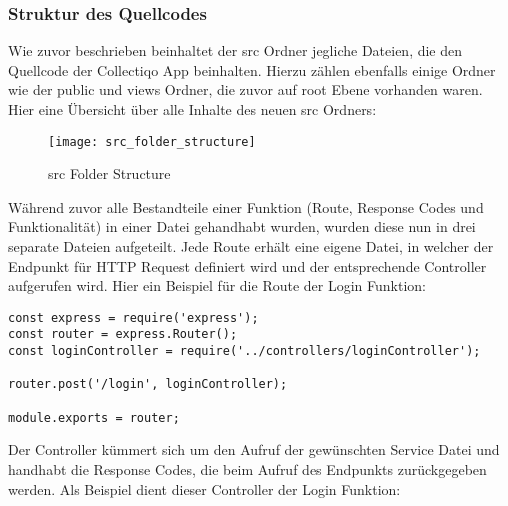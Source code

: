 \subsubsection{Struktur des Quellcodes}
Wie zuvor beschrieben beinhaltet der src Ordner jegliche Dateien, die den Quellcode der Collectiqo App beinhalten.
Hierzu zählen ebenfalls einige Ordner wie der public und views Ordner, die zuvor auf root Ebene vorhanden waren.
Hier eine Übersicht über alle Inhalte des neuen src Ordners:
\begin{figure}[h]
  \centering
  \texttt{[image: src\_folder\_structure]}
  \caption{src Folder Structure}
  \label{fig:src_folder_structure}
\end{figure}

Während zuvor alle Bestandteile einer Funktion (Route, Response Codes und Funktionalität) in einer Datei gehandhabt wurden, wurden diese nun in drei separate Dateien aufgeteilt.
Jede Route erhält eine eigene Datei, in welcher der Endpunkt für HTTP Request definiert wird und der entsprechende Controller aufgerufen wird.
Hier ein Beispiel für die Route der Login Funktion:
\lstset{language=javascript}
\begin{lstlisting}[label={lst:lst-login-route}]
const express = require('express');
const router = express.Router();
const loginController = require('../controllers/loginController');

router.post('/login', loginController);

module.exports = router;
\end{lstlisting}


Der Controller kümmert sich um den Aufruf der gewünschten Service Datei und handhabt die Response Codes, die beim Aufruf des Endpunkts zurückgegeben werden.
Als Beispiel dient dieser Controller der Login Funktion:

